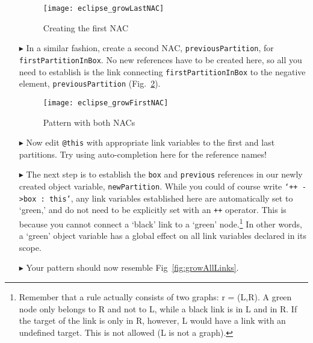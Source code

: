 \begin{itemize}
\begin{figure}[htbp]
\begin{center}
  \texttt{[image: eclipse\_growLastNAC]}
  \caption{Creating the first NAC \update}
  \label{fig:firstNAC}
\end{center}
\end{figure}

\vspace{0.5cm}

\item[$\blacktriangleright$] In a similar fashion, create a second NAC, \texttt{previousPartition}, for \texttt{firstPartitionInBox}. No new references have to
be created here, so all you need to establish is the link connecting \texttt{firstPartitionInBox} to the negative element, \texttt{previousPartition}
(Fig.~\ref{fig:growPatt}).

\begin{figure}[htp]
\begin{center}
  \texttt{[image: eclipse\_growFirstNAC]}
  \caption{Pattern with both NACs}
  \label{fig:growPatt}
\end{center}
\end{figure}

\item[$\blacktriangleright$] Now edit \texttt{@this} with appropriate link variables to the first and last partitions. Try using auto-completion here for the
reference names!

\newpage

\item[$\blacktriangleright$] The next step is to establish the \texttt{box} and \texttt{previous} references in our newly created object variable,
\texttt{newPartition}. While you could of course write \texttt{`++ ->box : this'}, any link variables established here are automatically set to `green,' and do
not need to be explicitly set with an \texttt{++} operator. This is because you cannot connect a `black' link to a `green' node.\footnote{Remember that a rule
actually consists of two graphs: r = (L,R). A green node only belongs to R and not to L, while a black link is in L and in R. If the target of the link is only
in R, however, L would have a link with an undefined target. This is not allowed (L is not a graph).} In other words, a `green' object variable has a global
effect on all link variables declared in its scope.

\item[$\blacktriangleright$] Your pattern should now resemble Fig~\ref{fig:growAllLinks}. 


\end{itemize}
